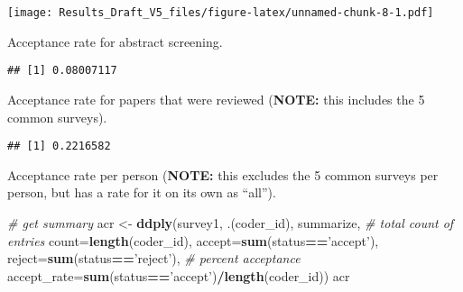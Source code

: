 \documentclass[
]{article}
\newenvironment{Shaded}{\begin{snugshade}}{\end{snugshade}}
\newcommand{\CommentTok}[1]{\textcolor[rgb]{0.56,0.35,0.01}{\textit{#1}}}
\newcommand{\DataTypeTok}[1]{\textcolor[rgb]{0.13,0.29,0.53}{#1}}
\newcommand{\KeywordTok}[1]{\textcolor[rgb]{0.13,0.29,0.53}{\textbf{#1}}}
\newcommand{\NormalTok}[1]{#1}
\newcommand{\OperatorTok}[1]{\textcolor[rgb]{0.81,0.36,0.00}{\textbf{#1}}}
\newcommand{\StringTok}[1]{\textcolor[rgb]{0.31,0.60,0.02}{#1}}
\begin{document}
\texttt{[image: Results\_Draft\_V5\_files/figure-latex/unnamed-chunk-8-1.pdf]}

Acceptance rate for abstract screening.

\begin{Shaded}
\end{Shaded}

\begin{verbatim}
## [1] 0.08007117
\end{verbatim}

Acceptance rate for papers that were reviewed (\textbf{NOTE:} this
includes the 5 common surveys).

\begin{Shaded}
\end{Shaded}

\begin{verbatim}
## [1] 0.2216582
\end{verbatim}

Acceptance rate per person (\textbf{NOTE:} this excludes the 5 common
surveys per person, but has a rate for it on its own as ``all'').

\begin{Shaded}
\begin{Highlighting}[]
\CommentTok{# get summary}
\NormalTok{  acr <-}\StringTok{ }\KeywordTok{ddply}\NormalTok{(survey1, .(coder_id), summarize,}
              \CommentTok{# total count of entries     }
              \DataTypeTok{count=}\KeywordTok{length}\NormalTok{(coder_id),}
              \DataTypeTok{accept=}\KeywordTok{sum}\NormalTok{(status}\OperatorTok{==}\StringTok{'accept'}\NormalTok{),}
              \DataTypeTok{reject=}\KeywordTok{sum}\NormalTok{(status}\OperatorTok{==}\StringTok{'reject'}\NormalTok{),}
              \CommentTok{# percent acceptance}
              \DataTypeTok{accept_rate=}\KeywordTok{sum}\NormalTok{(status}\OperatorTok{==}\StringTok{'accept'}\NormalTok{)}\OperatorTok{/}\KeywordTok{length}\NormalTok{(coder_id))}
\NormalTok{  acr}
\end{Highlighting}
\end{Shaded}
\end{document}
